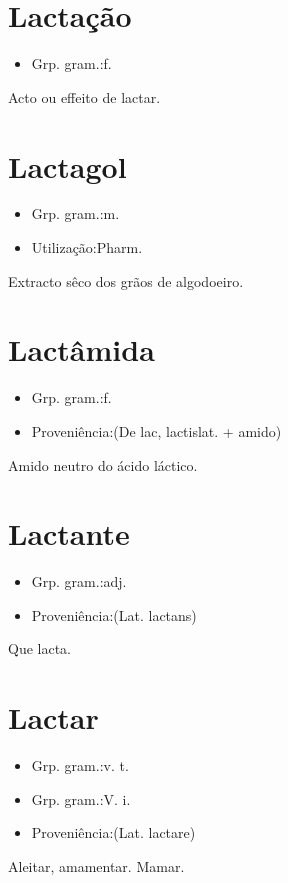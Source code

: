 \section{Lactação}
\begin{itemize}
\item {Grp. gram.:f.}
\end{itemize}
Acto ou effeito de lactar.
\section{Lactagol}
\begin{itemize}
\item {Grp. gram.:m.}
\end{itemize}
\begin{itemize}
\item {Utilização:Pharm.}
\end{itemize}
Extracto sêco dos grãos de algodoeiro.
\section{Lactâmida}
\begin{itemize}
\item {Grp. gram.:f.}
\end{itemize}
\begin{itemize}
\item {Proveniência:(De \textunderscore lac\textunderscore , \textunderscore lactis\textunderscore  lat. + \textunderscore amido\textunderscore )}
\end{itemize}
Amido neutro do ácido láctico.
\section{Lactante}
\begin{itemize}
\item {Grp. gram.:adj.}
\end{itemize}
\begin{itemize}
\item {Proveniência:(Lat. \textunderscore lactans\textunderscore )}
\end{itemize}
Que lacta.
\section{Lactar}
\begin{itemize}
\item {Grp. gram.:v. t.}
\end{itemize}
\begin{itemize}
\item {Grp. gram.:V. i.}
\end{itemize}
\begin{itemize}
\item {Proveniência:(Lat. \textunderscore lactare\textunderscore )}
\end{itemize}
Aleitar, amamentar.
Mamar.
